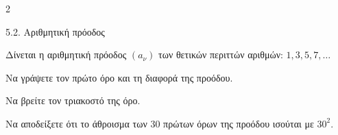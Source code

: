 \begin{ylh}{2}
    \item 5.2. Αριθμητική πρόοδος
\end{ylh}
Δίνεται η αριθμητική πρόοδος $(a_\nu)$ των θετικών περιττών αριθμών: $1, 3, 5, 7, \dots$
\begin{alist}
\item

\begin{rlist}
\item Να γράψετε τον πρώτο όρο και τη διαφορά της προόδου.

\item Να βρείτε τον τριακοστό της όρο.
\end{rlist}
\item Να αποδείξετε ότι το άθροισμα των 30 πρώτων όρων της προόδου ισούται με $30^2$. 
\end{alist}

